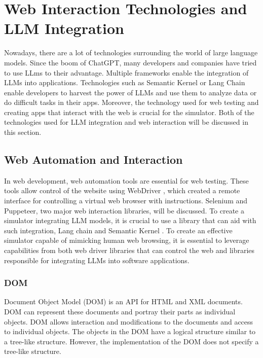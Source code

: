 \section{Web Interaction Technologies and LLM Integration}
\label{tech}

Nowadays, there are a lot of technologies surrounding the world of large language models. Since the boom of ChatGPT, many developers and companies have tried to use LLms to their advantage. Multiple frameworks enable the integration of LLMs into applications. Technologies such as Semantic Kernel or Lang Chain enable developers to harvest the power of LLMs and use them to analyze data or do difficult tasks in their apps. Moreover, the technology used for web testing and creating apps that interact with the web is crucial for the simulator. Both of the technologies used for LLM integration and web interaction will be discussed in this section. 

\subsection{Web Automation and Interaction}

In web development, web automation tools are essential for web testing. These tools allow control of the website using WebDriver \cite{webdriver_2018}, which created a remote interface for controlling a virtual web browser with instructions. Selenium and Puppeteer, two major web interaction libraries, will be discussed. To create a simulator integrating LLM models, it is crucial to use a library that can aid with such integration, Lang chain \cite{langchain_2023} and Semantic Kernel \cite{semantickernel}. To create an effective simulator capable of mimicking human web browsing, it is essential to leverage capabilities from both web driver libraries that can control the web and libraries responsible for integrating LLMs into software applications. 

\subsubsection{DOM}

Document Object Model (DOM) \cite{dom} is an API for HTML and XML documents. DOM can represent these documents and portray their parts as individual objects. DOM allows interaction and modifications to the documents and access to individual objects. The objects in the DOM have a logical structure similar to a tree-like structure. However, the implementation of the DOM does not specify a tree-like structure.  

